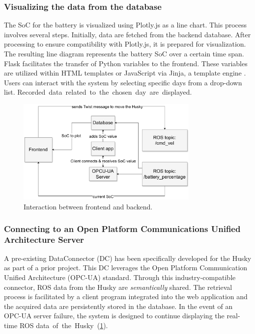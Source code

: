 \documentclass[conference]{IEEEtran}
\begin{document}
\subsubsection{Visualizing the data from the database}
The SoC for the battery is visualized using Plotly.js as a line chart. This process involves several steps. Initially, data are fetched from the backend database. After processing to ensure compatibility with Plotly.js, it is prepared for visualization. The resulting line diagram represents the battery SoC over a certain time span. Flask facilitates the transfer of Python variables to the frontend. 
These variables are utilized within HTML templates or JavaScript via Jinja, a template engine \cite{jinja}. Users can interact with the system by selecting specific days from a drop-down list. \mbox{Recorded data related to the chosen day are displayed.}
\begin{figure}[tp]
    \centerline{\includegraphics[width=8.9cm]{Pictures/backfrontbig.pdf}}
    \caption{Interaction between frontend and backend.}
    \label{fig:backfront}
\end{figure}
\subsubsection{Connecting to an Open Platform Communications Unified Architecture Server}
A pre-existing DataConnector (DC) has been specifically developed for the Husky as part of a prior project. This DC leverages the Open Platform Communication Unified Architecture \cite{opcua} (OPC-UA) standard. Through this industry-compatible connector,  ROS data from the Husky are \textit{semantically} shared. The retrieval process is facilitated by a client program integrated into the web application and the acquired data are persistently stored in the database. 
In the event of an OPC-UA server failure, the system is designed to continue displaying the real-time ROS \mbox{data of the Husky (\cref{fig:backfront}).}
\end{document}

